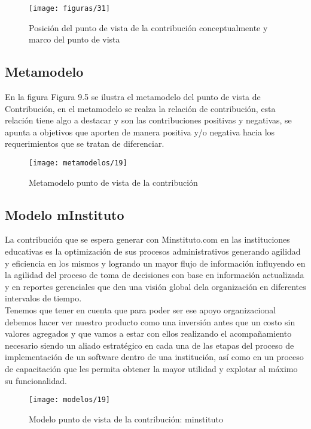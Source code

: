    \begin{figure}[H]
   	\centering
   	\texttt{[image: figuras/31]}
   	\captionsetup{width=.95\textwidth}
   	\caption{Posición del punto de vista de la contribución conceptualmente y marco del punto de vista}
   	\label{figura31}
   \end{figure}
   
   \subsection{Metamodelo}
   En la figura Figura 9.5 se ilustra el metamodelo del punto de vista de Contribución, en el metamodelo se realza la relación de contribución, esta relación tiene algo a destacar y son las contribuciones positivas y negativas, se apunta a objetivos que aporten de manera positiva y/o negativa hacia los requerimientos que se tratan de diferenciar.
   
   \begin{figure}[H]
   	\centering
   	\texttt{[image: metamodelos/19]}
   	\captionsetup{width=.95\textwidth}
   	\caption{Metamodelo punto de vista de la contribución}
   	\label{metamodelo19}
   \end{figure}
   
   \subsection{Modelo mInstituto}
  La contribución que se espera generar con Minstituto.com en las instituciones educativas es la optimización de sus procesos administrativos generando agilidad y eficiencia en los mismos y logrando un mayor flujo de información influyendo en la agilidad del proceso de toma de decisiones con base en información actualizada y en reportes gerenciales que den una visión global dela organización en diferentes intervalos de tiempo. \\
  
  Tenemos que tener en cuenta que para poder ser ese apoyo organizacional debemos hacer ver nuestro producto como una inversión antes que un costo sin valores agregados y que vamos a estar con ellos realizando el acompañamiento necesario siendo un aliado estratégico en cada una de las etapas del proceso de implementación de un software dentro de una institución, así como en un proceso de capacitación que les permita obtener la mayor utilidad y explotar al máximo su funcionalidad.
   \begin{figure}[H]
   	\centering
   	\texttt{[image: modelos/19]}
   	\captionsetup{width=.95\textwidth}
   	\caption{Modelo punto de vista de la contribución: minstituto}
   	\label{modelo19}
   \end{figure}
   
